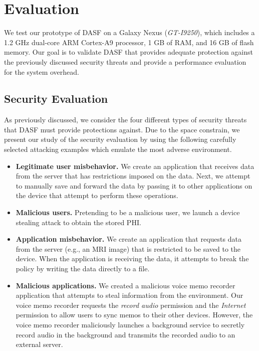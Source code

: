 \section{Evaluation}

We test our prototype of DASF on a Galaxy Nexus (\textit{GT-I9250}),
which includes a 1.2 GHz dual-core ARM Cortex-A9 processor,
1 GB of RAM, and 16 GB of flash memory.  Our goal is to
validate DASF that provides adequate protection against the
previously discussed security threats and provide a
performance evaluation for the system overhead. 

\subsection{Security Evaluation}

As previously discussed, we consider the four different
types of security threats that DASF must provide protections
against. Due to the space constrain, we present our study of the
security evaluation by using the following carefully selected
attacking examples which emulate the most adverse environment. 


\begin{itemize}
\item \textbf{Legitimate user misbehavior.}  We create an application
that receives data from the server that has restrictions imposed on
  the data.  Next, we attempt to manually save and forward the data by
  passing it to other applications on the device that attempt to
  perform these operations. 
\item \textbf{Malicious users.} Pretending to be a malicious user, we
  launch a device stealing attack to obtain the stored PHI.
\item \textbf{Application misbehavior.}  We create an application that requests
  data from the server (e.g., an MRI image) that is restricted to be saved
  to the device.  When the application is receiving the data, it attempts
  to break the policy by writing the data directly to a file.
\item \textbf{Malicious applications.}  We created a malicious voice memo recorder
  application that attempts to steal information from the environment. Our
  voice memo recorder requests the \textit{record audio} permission
  and the \textit{Internet} permission to allow users to sync memos to their
  other devices.  However, the voice memo recorder maliciously launches
  a background service to secretly record audio in the background and
  transmits the recorded audio to an external server.
\end{itemize}

